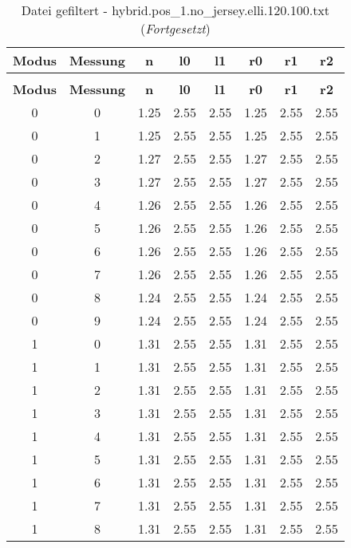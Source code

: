 \begin{longtable}{|c|c||c||c|c||c|c|c|}
	\caption{Datei gefiltert - hybrid.pos\_1.no\_jersey.elli.120.100.txt} \label{tab:hybrid.pos-1.no-jersey.elli.120.100.txt} \\ \hline
	\textbf{Modus} & \textbf{Messung} & \textbf{n} & \textbf{l0} & \textbf{l1} & \textbf{r0} & \textbf{r1} & \textbf{r2}\\ \hline
	\endfirsthead
	\caption[]{Datei gefiltert - hybrid.pos\_1.no\_jersey.elli.120.100.txt (\emph{Fortgesetzt})} \\ \hline
	\textbf{Modus} & \textbf{Messung} & \textbf{n} & \textbf{l0} & \textbf{l1} & \textbf{r0} & \textbf{r1} & \textbf{r2}\\ \hline
	\endhead
	0 & 0 & 1.25 & 2.55 & 2.55 & 1.25 & 2.55 & 2.55 \\ \hline
	0 & 1 & 1.25 & 2.55 & 2.55 & 1.25 & 2.55 & 2.55 \\ \hline
	0 & 2 & 1.27 & 2.55 & 2.55 & 1.27 & 2.55 & 2.55 \\ \hline
	0 & 3 & 1.27 & 2.55 & 2.55 & 1.27 & 2.55 & 2.55 \\ \hline
	0 & 4 & 1.26 & 2.55 & 2.55 & 1.26 & 2.55 & 2.55 \\ \hline
	0 & 5 & 1.26 & 2.55 & 2.55 & 1.26 & 2.55 & 2.55 \\ \hline
	0 & 6 & 1.26 & 2.55 & 2.55 & 1.26 & 2.55 & 2.55 \\ \hline
	0 & 7 & 1.26 & 2.55 & 2.55 & 1.26 & 2.55 & 2.55 \\ \hline
	0 & 8 & 1.24 & 2.55 & 2.55 & 1.24 & 2.55 & 2.55 \\ \hline
	0 & 9 & 1.24 & 2.55 & 2.55 & 1.24 & 2.55 & 2.55 \\ \hline
	1 & 0 & 1.31 & 2.55 & 2.55 & 1.31 & 2.55 & 2.55 \\ \hline
	1 & 1 & 1.31 & 2.55 & 2.55 & 1.31 & 2.55 & 2.55 \\ \hline
	1 & 2 & 1.31 & 2.55 & 2.55 & 1.31 & 2.55 & 2.55 \\ \hline
	1 & 3 & 1.31 & 2.55 & 2.55 & 1.31 & 2.55 & 2.55 \\ \hline
	1 & 4 & 1.31 & 2.55 & 2.55 & 1.31 & 2.55 & 2.55 \\ \hline
	1 & 5 & 1.31 & 2.55 & 2.55 & 1.31 & 2.55 & 2.55 \\ \hline
	1 & 6 & 1.31 & 2.55 & 2.55 & 1.31 & 2.55 & 2.55 \\ \hline
	1 & 7 & 1.31 & 2.55 & 2.55 & 1.31 & 2.55 & 2.55 \\ \hline
	1 & 8 & 1.31 & 2.55 & 2.55 & 1.31 & 2.55 & 2.55 \\ \hline

\end{longtable}
